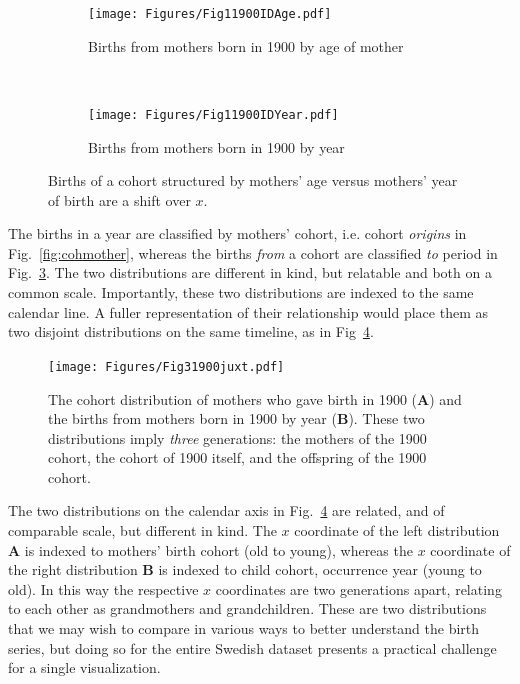 \documentclass{article}
\begin{document}
\begin{figure}[ht!]
\begin{subfigure}[t]{0.5\textwidth}
        \centering
        \texttt{[image: Figures/Fig11900IDAge.pdf]}
        \caption{Births from mothers born in 1900 by age of mother}
        \label{fig:age1900mother}
\end{subfigure}
~
\begin{subfigure}[t]{0.5\textwidth}
        \centering
        \texttt{[image: Figures/Fig11900IDYear.pdf]}
        \caption{Births from mothers born in 1900 by year}
          \label{fig:year1900}
\end{subfigure}
\caption{Births of a cohort structured by mothers' age versus mothers' year of birth are a shift over $x$. }
\end{figure}

The births in a year are classified by mothers' cohort, i.e. cohort \emph{origins} in Fig.~\ref{fig:cohmother}, whereas the births \emph{from} a cohort are classified \emph{to} period in Fig.~\ref{fig:year1900}. The two distributions are different in kind, but relatable and both on a common scale. Importantly, these two distributions are indexed to the same calendar line. A fuller representation of their relationship would place them as two disjoint distributions on the same timeline, as in Fig~\ref{fig:juxt}.

\begin{figure}[ht!]
 \centering
        \texttt{[image: Figures/Fig31900juxt.pdf]}
        \caption{The cohort distribution of mothers who gave birth in 1900 (\textbf{A}) and the births from mothers born in 1900 by year (\textbf{B}). These two distributions imply \emph{three} generations: the mothers of the 1900 cohort, the cohort of 1900 itself, and the offspring of the 1900 cohort.}
          \label{fig:juxt}
\end{figure}

The two distributions on the calendar axis in Fig.~\ref{fig:juxt} are related, and of comparable scale, but different in kind. The $x$ coordinate of the left distribution \textbf{A} is indexed to mothers' birth cohort (old to young), whereas the $x$ coordinate of the right distribution \textbf{B} is indexed to child cohort, occurrence year (young to old). In this way the respective $x$ coordinates are two generations apart, relating to each other as grandmothers and grandchildren. These are two distributions that we may wish to compare in various ways to better understand the birth series, but doing so for the entire Swedish dataset presents a practical challenge for a single visualization. 
\end{document}

